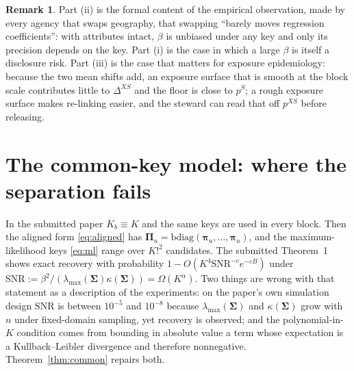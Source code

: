 \documentclass[11pt]{article}
\theoremstyle{definition}
\newtheorem{remark}{Remark}
\newcommand{\bSig}{\boldsymbol{\Sigma}}
\newcommand{\bpi}{\boldsymbol{\pi}}
\newcommand{\bPi}{\boldsymbol{\Pi}}
\begin{document}
\begin{remark}\label{rem:sub}
Part (ii) is the formal content of the empirical observation, made by every agency that swaps geography, that swapping ``barely moves regression coefficients'': with attributes intact, $\beta$ is unbiased under any key and only its precision depends on the key. Part (i) is the case in which a large $\beta$ is itself a disclosure risk. Part (iii) is the case that matters for exposure epidemiology: because the two mean shifts add, an exposure surface that is smooth at the block scale contributes little to $\Delta^{XS}$ and the floor is close to $p^S$; a rough exposure surface makes re-linking easier, and the steward can read that off $p^{XS}$ before releasing.
\end{remark}

\section{The common-key model: where the separation fails}\label{sec:common}

In the submitted paper $K_b\equiv K$ and the same keys are used in every block. Then the aligned form \eqref{eq:aligned} has $\bPi_u=\mathrm{bdiag}(\bpi_u,\dots,\bpi_u)$, and the maximum-likelihood keys \eqref{eq:ml} range over $K!^2$ candidates. The submitted Theorem~1 shows exact recovery with probability $1-O(K^4\mathrm{SNR}^{-c}e^{-cB})$ under $\mathrm{SNR}:=\beta^2/(\lambda_{\max}(\bSig)\kappa(\bSig))=\Omega(K^\alpha)$. Two things are wrong with that statement as a description of the experiments: on the paper's own simulation design $\mathrm{SNR}$ is between $10^{-5}$ and $10^{-8}$ because $\lambda_{\max}(\bSig)$ and $\kappa(\bSig)$ grow with $n$ under fixed-domain sampling, yet recovery is observed; and the polynomial-in-$K$ condition comes from bounding in absolute value a term whose expectation is a Kullback--Leibler divergence and therefore nonnegative. Theorem~\ref{thm:common} repairs both.
\end{document}
